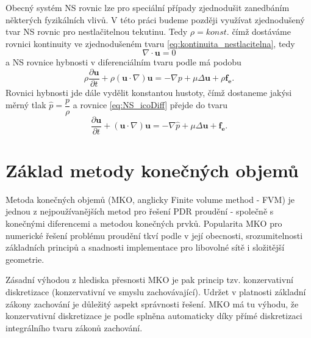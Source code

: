 Obecný systém NS rovnic lze pro speciální případy zjednodušit zanedbáním některých fyzikálních vlivů. 
V této práci budeme později využívat zjednodušený tvar NS rovnic  pro nestlačitelnou tekutinu. 
Tedy $\rho=konst.$ čímž dostáváme rovnici kontinuity ve zjednodušeném tvaru \ref{eq:kontinuita_nestlacitelna}, tedy
\begin{equation}
\nabla\cdot\mathbf{u} = 0
\end{equation}
a NS rovnice hybnosti v diferenciálním tvaru podle \cite{hirsch2007numerical} má podobu 
\begin{equation}\label{eq:NS_icoDiff}
\rho \dfrac{\partial \mathbf{u}}{\partial t}+ \rho(\mathbf{u}\cdot \nabla)\mathbf{u} = -\nabla p + \mu \Delta \mathbf{u} + \rho \mathbf{f_e}.
\end{equation}
Rovnici hybnosti jde dále vydělit konstantou hustoty, čímž dostaneme jakýsi měrný tlak $ \widehat{p} = \dfrac{p}{\rho} $ a rovnice \ref{eq:NS_icoDiff} přejde do tvaru
\begin{equation}\label{eq:NS_icoPseudotlak}
\dfrac{\partial \mathbf{u}}{\partial t}+ (\mathbf{u}\cdot \nabla)\mathbf{u} = -\nabla \widehat{p} + \mu \Delta \mathbf{u} + \mathbf{f_e}.
\end{equation}



\section{Základ metody konečných objemů}
Metoda konečných objemů (MKO, anglicky Finite volume method - FVM) je jednou z nejpoužívanějších metod pro řešení PDR proudění - společně s konečnými diferencemi a metodou konečných prvků. 
Popularita MKO pro numerické řešení problému proudění tkví podle \cite{hirsch2007numerical} v její obecnosti, srozumitelnosti základních principů a snadnosti implementace pro libovolné sítě i složitější geometrie.

Zásadní výhodou z hlediska přesnosti MKO je pak princip tzv. konzervativní diskretizace (konzervativní ve smyslu zachovávající). Udržet v platnosti základní zákony zachování je důležitý aspekt správnosti řešení. MKO má tu výhodu, že konzervativní diskretizace je podle \cite{hirsch2007numerical} splněna automaticky díky přímé diskretizaci integrálního tvaru zákonů zachování. 

